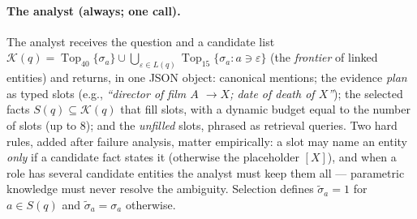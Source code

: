 \documentclass[11pt,a4paper]{article}
\DeclareMathOperator*{\Top}{Top}
\begin{document}
\paragraph{The analyst (always; one call).} The analyst receives the question
and a candidate list $\mathcal K(q)=\Top_{40}\{\sigma_a\}\cup
\bigcup_{\varepsilon\in L(q)}\Top_{15}\{\sigma_a: a\ni\varepsilon\}$ (the
\emph{frontier} of linked entities) and returns, in one JSON object:
canonical mentions; the evidence \emph{plan} as typed slots (e.g.,
\emph{``director of film $A$ $\to X$; date of death of $X$''}); the selected
facts $S(q)\subseteq\mathcal K(q)$ that fill slots, with a dynamic budget
equal to the number of slots (up to $8$); and the \emph{unfilled} slots,
phrased as retrieval queries. Two hard rules, added after failure analysis,
matter empirically: a slot may name an entity \emph{only} if a candidate fact
states it (otherwise the placeholder $[X]$), and when a role has several
candidate entities the analyst must keep them all --- parametric knowledge
must never resolve the ambiguity. Selection defines
$\tilde\sigma_a=1$ for $a\in S(q)$ and $\tilde\sigma_a=\sigma_a$ otherwise.
\end{document}
